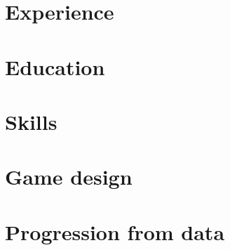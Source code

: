 \def\sitepage{game-experiments}
\section{Experience}






\section{Education}






\clearpage




\section{Skills}
\begin{cvcolumns}
  
  
  
\end{cvcolumns}


\section{Game design}





\section{Progression from data}

